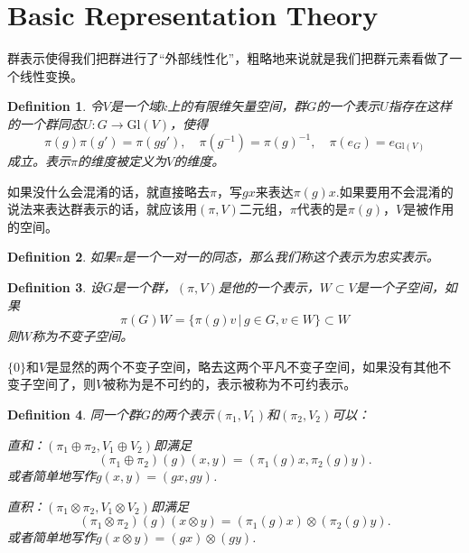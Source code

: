 \documentclass[8pt]{book}
\theoremstyle{plain}
\newtheorem{defi}{Definition}
\begin{document}
\section{Basic Representation Theory}
群表示使得我们把群进行了“外部线性化”，粗略地来说就是我们把群元素看做了一个线性变换。
\begin{defi}
令$V$是一个域$k$上的有限维矢量空间，群$G$的一个表示$U$指存在这样的一个群同态$U:G\rightarrow \mathrm{Gl}(V)$，使得
\[
	\pi(g)\pi(g')=\pi(gg'),\quad \pi(g^{-1})=\pi(g)^{-1},\quad \pi(e_G)=e_{\mathrm{Gl}(V)}
\]
成立。表示$\pi$的维度被定义为$V$的维度。
\end{defi}
如果没什么会混淆的话，就直接略去$\pi$，写$gx$来表达$\pi(g)x$.如果要用不会混淆的说法来表达群表示的话，就应该用$(\pi,V)$二元组，$\pi$代表的是$\pi(g)$，$V$是被作用的空间。
\begin{defi}
如果$\pi$是一个一对一的同态，那么我们称这个表示为忠实表示。
\end{defi}
\begin{defi}
设$G$是一个群，$(\pi,V)$是他的一个表示，$W\subset V$是一个子空间，如果
\[
\pi(G)W=\{\pi(g)v\,|\,g\in G,v\in W\}\subset W
\]
则$W$称为不变子空间。
\end{defi}
$\{0\}$和$V$是显然的两个不变子空间，略去这两个平凡不变子空间，如果没有其他不变子空间了，则$V$被称为是不可约的，表示被称为不可约表示。

\begin{defi}
同一个群$G$的两个表示$(\pi_1,V_1)$和$(\pi_2,V_2)$可以：

 直和：$(\pi_1\oplus \pi_2,V_1\oplus V_2)$即满足
\[
	(\pi_1\oplus \pi_2)(g)(x,y)=(\pi_1(g)x,\pi_2(g)y).
\]
或者简单地写作$g(x,y)=(gx,gy)$.

 直积：$(\pi_1\otimes \pi_2,V_1\otimes V_2)$即满足
\[
	(\pi_1\otimes \pi_2)(g)(x\otimes y)=(\pi_1(g)x)\otimes (\pi_2(g)y).
\]
或者简单地写作$g(x\otimes y)=(gx)\otimes(gy)$.
\end{defi}
\end{document}
